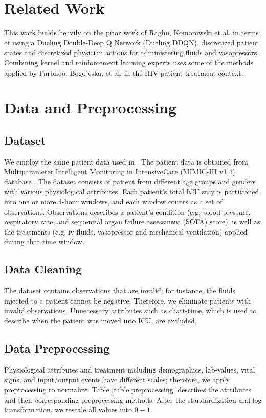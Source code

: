 \documentclass[letterpaper]{article}
\begin{document}
\section{Related Work}

This work builds heavily on the prior work of Raghu, Komorowski et al. \cite{DBLP:journals/corr/RaghuKCSG17}
in terms of using a Dueling Double-Deep Q Network (Dueling DDQN), discretized patient states and 
discretized physician actions for administering fluids and vasopressors.  Combining kernel
and reinforcement learning experts uses some of the methods applied by Parbhoo, Bogojeska, et al. 
\cite{parbhoo2017combining} in the HIV patient treatment context.

\section{Data and Preprocessing}

\subsection{Dataset}
We employ the same patient data used in \cite{DBLP:journals/corr/RaghuKCSG17}. The patient data is obtained from Multiparameter Intelligent Monitoring in IntensiveCare (MIMIC-III v1.4) database \cite{johnson2016mimic}. The dataset consists of patient from different age groups and genders with various physiological attributes. Each patient's total ICU stay is partitioned into one or more 4-hour windows, and each window counts as a set of observations. Observations describes a patient's condition (e.g. blood pressure, respiratory rate, and sequential organ failure assessment (SOFA) score) as well as the treatments (e.g. iv-fluids, vasopressor and mechanical ventilation) applied during that time window.

\subsection{Data Cleaning}
The dataset contains observations that are invalid; for instance, the fluids injected to a patient cannot be negative. Therefore, we eliminate patients with invalid observations. Unnecessary attributes such as chart-time, which is used to describe when the patient was moved into ICU, are excluded. 

\subsection{Data Preprocessing}
Physiological attributes and treatment including demographics, lab-values, vital signs, and input/output events have different scales; therefore, we apply preprocessing to normalize. Table \ref{table:preprocessing} describes the attributes and their corresponding preprocessing methods. After the standardization and log transformation, we rescale all values into $0-1$.  
\end{document}
